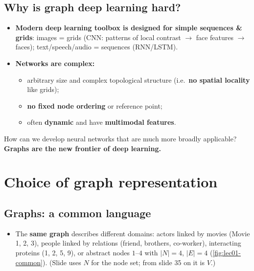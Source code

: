 \subsection{Why is graph deep learning hard?}\label{sec:lec01-hard}

\begin{itemize}
  \item \textbf{Modern deep learning toolbox is designed for simple sequences \& grids}:
    images = grids (CNN: patterns of local contrast $\to$ face features $\to$ faces);
    text/speech/audio = sequences (RNN/LSTM).
  \item \textbf{Networks are complex:}
    \begin{itemize}
      \item arbitrary size and complex topological structure (i.e.\ \textbf{no spatial
        locality} like grids);
      \item \textbf{no fixed node ordering} or reference point;
      \item often \textbf{dynamic} and have \textbf{multimodal features}.
    \end{itemize}
\end{itemize}

\begin{keyidea}
  How can we develop neural networks that are much more broadly applicable?
  \textbf{Graphs are the new frontier of deep learning.}
\end{keyidea}

\section{Choice of graph representation}\label{sec:lec01-representation}

\subsection{Graphs: a common language}\label{sec:lec01-common}

\begin{itemize}
  \item The \textbf{same graph} describes different domains: actors linked by movies
    (Movie 1, 2, 3), people linked by relations (friend, brothers, co-worker), interacting
    proteins (1, 2, 5, 9), or abstract nodes $1$--$4$ with $|N|=4$, $|E|=4$
    (\cref{fig:lec01-common}). (Slide uses $N$ for the node set; from slide 35 on it is $V$.)
\end{itemize}

